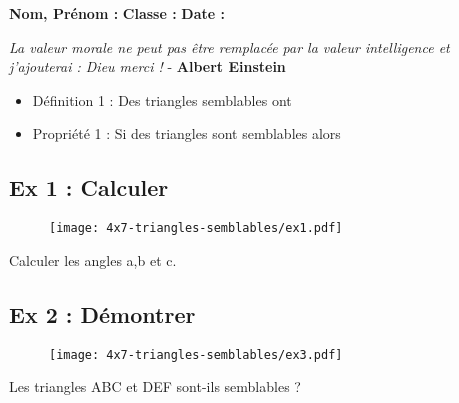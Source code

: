 



\textbf{Nom, Prénom :} \hspace{8cm} \textbf{Classe :} \hspace{3cm} \textbf{Date :}\\

\begin{center}
  \textit{La valeur morale ne peut pas être remplacée par la valeur intelligence et j'ajouterai : Dieu merci !}  - \textbf{Albert Einstein}
\end{center}

\begin{itemize}[label={$\bullet$}]
  \item Définition 1 : Des triangles semblables ont \dotfill
  \item Propriété 1 : Si des triangles sont semblables alors \dotfill
  \end{itemize}


\subsection*{Ex 1 : Calculer}

\begin{multicols}{2}

\begin{figure}[H]
  \centering
  \texttt{[image: 4x7-triangles-semblables/ex1.pdf]}
\end{figure}

Calculer les angles a,b et c. \columnbreak

\Pointilles[8]

\end{multicols}

\subsection*{Ex 2 : Démontrer}

\begin{multicols}{2}
\begin{figure}[H]
  \centering
  \texttt{[image: 4x7-triangles-semblables/ex3.pdf]}
\end{figure}

Les triangles ABC et DEF sont-ils semblables ?

\columnbreak

\Pointilles[8]

\end{multicols}

